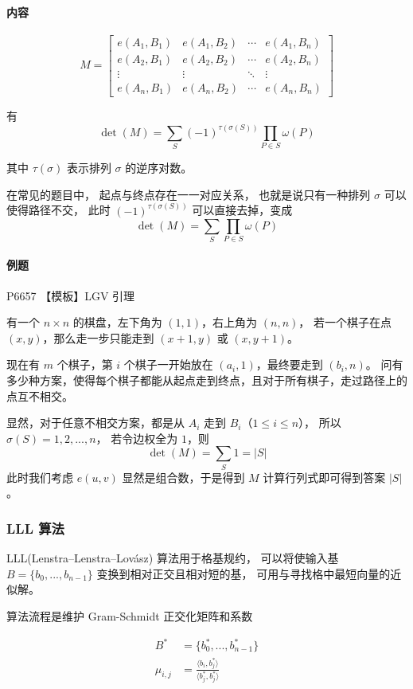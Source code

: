 \documentclass{ctexart}
\begin{document}
\paragraph{内容}

$$
M = \begin{bmatrix}e(A_1,B_1)&e(A_1,B_2)&\cdots&e(A_1,B_n)\\
    e(A_2,B_1)&e(A_2,B_2)&\cdots&e(A_2,B_n)\\
    \vdots&\vdots&\ddots&\vdots\\
    e(A_n,B_1)&e(A_n,B_2)&\cdots&e(A_n,B_n)\end{bmatrix}
$$

有 
$$
\det(M)=\sum_{S}(-1)^{\tau(\sigma(S))}\prod_{P \in S} \omega(P)
$$

其中 $\tau(\sigma)$ 表示排列 $\sigma$ 的逆序对数。

在常见的题目中，
起点与终点存在一一对应关系，
也就是说只有一种排列 $\sigma$ 可以使得路径不交，
此时 $(-1)^{\tau(\sigma(S))}$ 可以直接去掉，变成
$$
\det(M)=\sum_{S}\prod_{P \in S} \omega(P)
$$

\paragraph{例题} P6657 【模板】LGV 引理

有一个 $n \times n$ 的棋盘，左下角为 $(1, 1)$，右上角为 $(n, n)$，
若一个棋子在点 $(x,y)$，那么走一步只能走到 $(x+1,y)$ 或 $(x,y+1)$。

现在有 $m$ 个棋子，第 $i$ 个棋子一开始放在 $(a_i, 1)$，最终要走到 $(b_i, n)$。
问有多少种方案，使得每个棋子都能从起点走到终点，且对于所有棋子，走过路径上的点互不相交。

显然，对于任意不相交方案，都是从 $A_i$ 走到 $B_i$（$1 \le i \le n$），
所以 $\sigma(S) = {1, 2, ..., n}$，
若令边权全为 $1$，则
$$
\det(M)= \sum_{S} 1 = |S|
$$
此时我们考虑 $e(u, v)$ 显然是组合数，于是得到 $M$ 计算行列式即可得到答案 $|S|$。

\subsubsection{LLL 算法}
LLL(Lenstra–Lenstra–Lovász) 算法用于格基规约，
可以将使输入基 $B=\{b_0, ..., b_{n - 1}\}$ 变换到相对正交且相对短的基，
可用与寻找格中最短向量的近似解。

算法流程是维护 Gram-Schmidt 正交化矩阵和系数

\begin{align*}
    B^* &= \{b^*_0, ..., b^*_{n - 1}\}\\
    \mu_{i, j} &= \frac{\langle b_i, b^*_j \rangle}{\langle b^*_j, b^*_j \rangle}
\end{align*}
\end{document}
